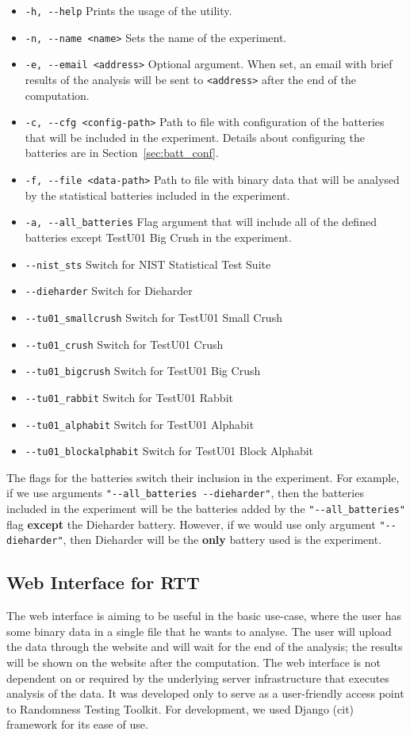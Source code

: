 \documentclass[
  digital,  	%
  color,		%
  oneside,   	%
  12pt,
  nocover,
  notable,
  nolof,
  nolot,
]{fithesis3}
\begin{document}
\begin{itemize}
\item \texttt{-h, -{}-help} Prints the usage of the utility.
\item \texttt{-n, -{}-name <name>} Sets the name of the experiment.
\item \texttt{-e, -{}-email <address>} Optional argument. When set, an email with brief results of the analysis will be sent to \texttt{<address>} after the end of the computation.
\item \texttt{-c, -{}-cfg <config-path>} Path to file with configuration of the batteries that will be included in the experiment. Details about configuring the batteries are in Section~\ref{sec:batt_conf}.
\item \texttt{-f, -{}-file <data-path>} Path to file with binary data that will be analysed by the statistical batteries included in the experiment.
\item \texttt{-a, -{}-all\_batteries} Flag argument that will include all of the defined batteries except TestU01 Big Crush in the experiment.
\item \texttt{-{}-nist\_sts} Switch for NIST Statistical Test Suite
\item \texttt{-{}-dieharder} Switch for Dieharder 
\item \texttt{-{}-tu01\_smallcrush} Switch for TestU01 Small Crush
\item \texttt{-{}-tu01\_crush} Switch for TestU01 Crush
\item \texttt{-{}-tu01\_bigcrush} Switch for TestU01 Big Crush
\item \texttt{-{}-tu01\_rabbit} Switch for TestU01 Rabbit
\item \texttt{-{}-tu01\_alphabit} Switch for TestU01 Alphabit
\item \texttt{-{}-tu01\_blockalphabit} Switch for TestU01 Block Alphabit
\end{itemize}

The flags for the batteries switch their inclusion in the experiment. For example, if we use arguments \texttt{"-{}-all\_batteries -{}-dieharder"}, then the batteries included in the experiment will be the batteries added by the \texttt{"-{}-all\_batteries"} flag \textbf{except} the Dieharder battery. However, if we would use only argument \texttt{"-{}-dieharder"}, then Dieharder will be the \textbf{only} battery used is the experiment.

\subsection{Web Interface for RTT}
The web interface is aiming to be useful in the basic use-case, where the user has some binary data in a single file that he wants to analyse. The user will upload the data through the website and will wait for the end of the analysis; the results will be shown on the website after the computation. The web interface is not dependent on or required by the underlying server infrastructure that executes analysis of the data. It was developed only to serve as a user-friendly access point to Randomness Testing Toolkit. For development, we used Django (cit) framework for its ease of use.
\end{document}

